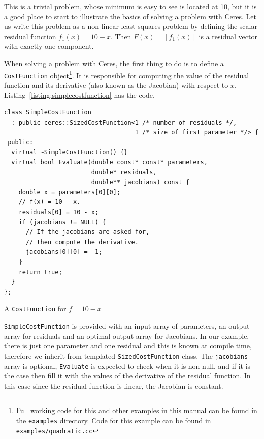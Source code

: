 This is a trivial problem, whose minimum is easy to see is located at 10, but it is a good place to start to illustrate the basics of solving a problem with Ceres. Let us write this problem as a non-linear least squares problem by defining the scalar residual function $f_1(x) = 10 - x$. Then $F(x) = [f_1(x)]$ is a residual vector with exactly one component.

When solving a problem with Ceres, the first thing to do is to define a \texttt{CostFunction}
object\footnote{Full working code for this and other examples in this manual can be found in the \texttt{examples} directory. Code for this example can be found in \texttt{examples/quadratic.cc}}. It is responsible for computing the value of the residual function and its derivative (also known as the Jacobian) with respect to $x$. Listing~\ref{listing:simplecostfunction} has the code.
\begin{listing}[H]
\begin{verbatim}
class SimpleCostFunction
  : public ceres::SizedCostFunction<1 /* number of residuals */,
                                    1 /* size of first parameter */> {
 public:
  virtual ~SimpleCostFunction() {}
  virtual bool Evaluate(double const* const* parameters,
                        double* residuals,
                        double** jacobians) const {
    double x = parameters[0][0];
    // f(x) = 10 - x.
    residuals[0] = 10 - x;
    if (jacobians != NULL) {
	  // If the jacobians are asked for,
	  // then compute the derivative.
      jacobians[0][0] = -1;
    }
    return true;
  }
};
\end{verbatim}
\caption{A \texttt{CostFunction} for $f = 10 - x $}
\label{listing:simplecostfunction}
\end{listing}
\texttt{SimpleCostFunction} is provided with an input array of parameters, an output array for residuals and an optimal output array for Jacobians. In our example, there is just one parameter and one residual and this is known at compile time, therefore we inherit from templated \texttt{SizedCostFunction} class. The \texttt{jacobians} array is optional, \texttt{Evaluate} is expected to check when it is non-null, and if it is the case then fill it with the values of the derivative of the residual function. In this case since the residual function is linear, the Jacobian is constant.

